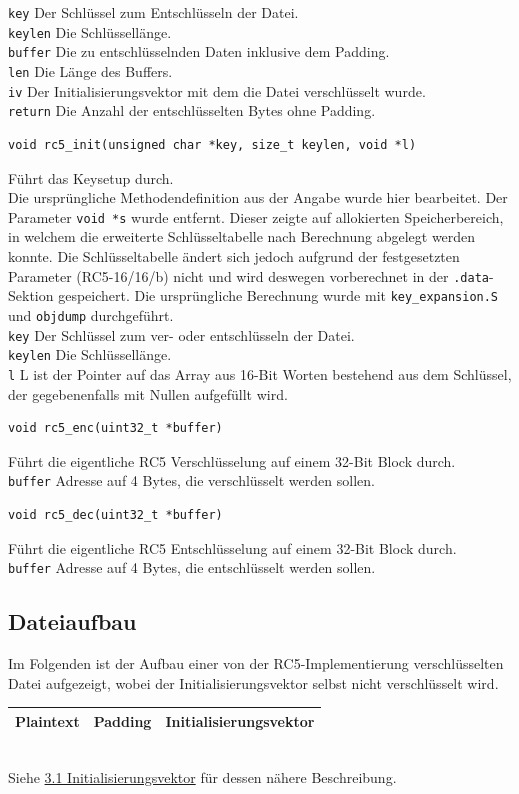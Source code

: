 \documentclass[course=erap]{aspdoc}
\begin{document}
\texttt{key} Der Schlüssel zum Entschlüsseln der Datei.\\
\texttt{keylen} Die Schlüssellänge.\\
\texttt{buffer} Die zu entschlüsselnden Daten inklusive dem Padding.\\
\texttt{len} Die Länge des Buffers.\\
\texttt{iv} Der Initialisierungsvektor mit dem die Datei verschlüsselt wurde.\\
\texttt{return} Die Anzahl der entschlüsselten Bytes ohne Padding.\\
\begin{verbatim}
void rc5_init(unsigned char *key, size_t keylen, void *l)
\end{verbatim}
Führt das Keysetup durch.\\[1.5mm]
Die ursprüngliche Methodendefinition aus der Angabe wurde hier bearbeitet.
Der Parameter \texttt{void *s} wurde entfernt.
Dieser zeigte auf allokierten Speicherbereich, in welchem die erweiterte Schlüsseltabelle nach
Berechnung abgelegt werden konnte.
Die Schlüsseltabelle ändert sich jedoch aufgrund der festgesetzten Parameter (RC5-16/16/b) nicht
und wird deswegen vorberechnet in der \texttt{.data}-Sektion gespeichert.
Die ursprüngliche Berechnung wurde mit \texttt{key\_expansion.S} und \texttt{objdump}
durchgeführt.\\[1.5mm]
\texttt{key} Der Schlüssel zum ver- oder entschlüsseln der Datei.\\
\texttt{keylen} Die Schlüssellänge.\\
\texttt{l} L ist der Pointer auf das Array aus 16-Bit Worten bestehend aus dem Schlüssel, der
gegebenenfalls mit Nullen aufgefüllt wird.
\begin{verbatim}
void rc5_enc(uint32_t *buffer)
\end{verbatim}
Führt die eigentliche RC5 Verschlüsselung auf einem 32-Bit Block durch.\\[1.5mm]
\texttt{buffer} Adresse auf 4 Bytes, die verschlüsselt werden sollen.\\
\begin{verbatim}
void rc5_dec(uint32_t *buffer)
\end{verbatim}
Führt die eigentliche RC5 Entschlüsselung auf einem 32-Bit Block durch.\\[1.5mm]
\texttt{buffer} Adresse auf 4 Bytes, die entschlüsselt werden sollen.

\subsection{Dateiaufbau}
Im Folgenden ist der Aufbau einer von der RC5-Implementierung verschlüsselten Datei aufgezeigt,
wobei der Initialisierungsvektor selbst nicht verschlüsselt wird.\\[1.5mm]
\begin{tabularx}{\textwidth}{|X|X|X|}
    \hline
    \centering Plaintext & \centering Padding & \centering\arraybackslash Initialisierungsvektor\\
    \hline
\end{tabularx}\\[1.5mm]
Siehe \hyperref[sec:Initialisierungsvektor]{3.1 Initialisierungsvektor} für dessen nähere
Beschreibung.
\end{document}
